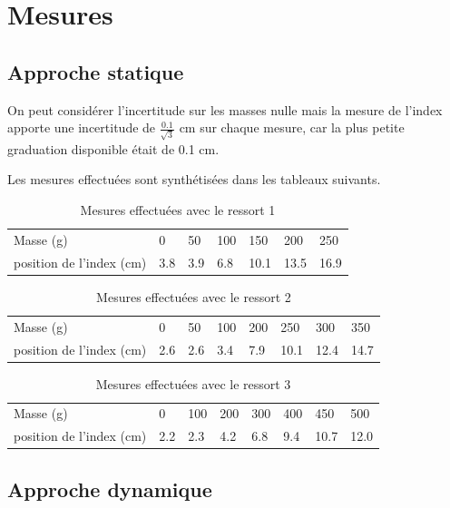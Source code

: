\documentclass[a4paper,10pt,french]{scrartcl}
\begin{document}
\section{Mesures}
\subsection{Approche statique}
On peut considérer l'incertitude sur les masses nulle mais la mesure de l'index apporte une incertitude de \(\frac{0.1}{\sqrt{3}}\) cm sur chaque mesure, car la plus petite graduation disponible était de 0.1 cm.

Les mesures effectuées sont synthétisées dans les tableaux suivants.
\begin{table}[H]
\begin{center}
 \begin{tabular}{lllllll}
Masse (g) & 0 & 50 &100&150&200&250\\
position de l'index (cm) & 3.8 & 3.9&6.8&10.1&13.5&16.9
\end{tabular}
\end{center}
\caption{Mesures effectuées avec le ressort 1}
\end{table}
\begin{table}[H]
\begin{center}
 \begin{tabular}{llllllll}
Masse (g) & 0 &50&100&200&250&300&350\\
position de l'index (cm) & 2.6 & 2.6&3.4&7.9&10.1&12.4&14.7
\end{tabular}
\end{center}
\caption{Mesures effectuées avec le ressort 2}
\end{table}
\begin{table}[H]
\begin{center}
 \begin{tabular}{llllllll}
Masse (g) & 0 &100&200&300&400&450&500\\
position de l'index (cm) & 2.2 & 2.3&4.2&6.8&9.4&10.7&12.0
\end{tabular}
\end{center}
\caption{Mesures effectuées avec le ressort 3}
\end{table}


\subsection{Approche dynamique}
\end{document}
